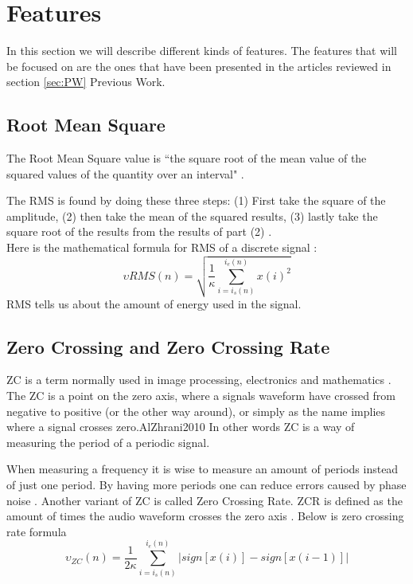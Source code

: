 \section{Features}
In this section we will describe different kinds of features. The features that will be focused on are the ones that have been presented in the articles reviewed in section \ref{sec:PW} Previous Work.

\subsection{Root Mean Square}
The Root Mean Square value is “the square root of the mean value of the squared values of the quantity over an interval"  \citep{RMS-kilde...}.


The RMS is found by doing these three steps:
(1) First take the square of the amplitude, (2) then take the mean of the squared results, (3) lastly take the square root of the results from the results of part (2) \citep{Bird2007}. \\ Here is the mathematical formula for RMS of a discrete signal \citep{ACA}:
\begin{equation}\label{eq:RMS formular}
\upsilon {RMS}(n) = \sqrt{\frac{1}{\kappa}\sum_{i=i_s(n)}^{i_e(n)} x(i)^2}
\end{equation}
RMS tells us about the amount of energy used in the signal.

\subsection{Zero Crossing and Zero Crossing Rate}
ZC is a term normally used in image processing, electronics and mathematics \citep{AlZhrani2010}. The ZC is a point on the zero axis, where a signals waveform have crossed from negative to positive (or the other way around), or simply as the name implies where a signal crosses zero.{AlZhrani2010}
In other words ZC is a way of measuring the period of a periodic signal\citep{RWW2012}.


When measuring a frequency it is wise to measure an amount of periods instead of just one period. By having more periods one can reduce errors caused by phase noise \citep{RWW2012}.
Another variant of ZC is called Zero Crossing Rate. ZCR is defined as the amount of times the audio waveform crosses the zero axis \citep{DSShete}.
Below is zero crossing rate formula \citep{ACA} 
\begin{equation}\label{eq:ZCR}
\upsilon_{ZC}(n)= \frac{1}{2 \kappa}\sum_{i=i_s(n)}^{i_e (n)}|sign[x(i)]-sign[x(i-1)]|
\end{equation}

